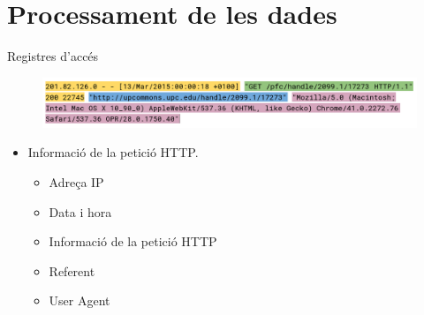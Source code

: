 \section{Processament de les dades}\label{sec:data-processing}

\begin{frame}{Registres d'accés}

\begin{figure}
    \includegraphics[width=\textwidth]{figures/example-log}\label{fig:log-example}
\end{figure}

\begin{itemize}[<+- | alert@+>]
    \item Informació de la petició HTTP.
    \begin{itemize}[<+- | alert@+>]
        \item Adreça IP
        \item Data i hora
        \item Informació de la petició HTTP
        \item Referent
        \item User Agent
    \end{itemize}
\end{itemize}

\end{frame}